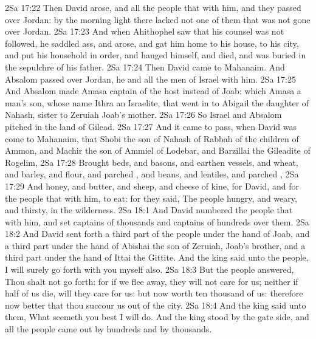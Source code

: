 \vs 2Sa 17:22 Then David arose, and all the people that  with him, and they passed over Jordan: by the morning light there lacked not one of them that was not gone over Jordan.
\vs 2Sa 17:23 And when Ahithophel saw that his counsel was not followed, he saddled  ass, and arose, and gat him home to his house, to his city, and put his household in order, and hanged himself, and died, and was buried in the sepulchre of his father.
\vs 2Sa 17:24 Then David came to Mahanaim. And Absalom passed over Jordan, he and all the men of Israel with him.
\vs 2Sa 17:25 And Absalom made Amasa captain of the host instead of Joab: which Amasa  a man's son, whose name  Ithra an Israelite, that went in to Abigail the daughter of Nahash, sister to Zeruiah Joab's mother.
\vs 2Sa 17:26 So Israel and Absalom pitched in the land of Gilead.
\vs 2Sa 17:27 And it came to pass, when David was come to Mahanaim, that Shobi the son of Nahash of Rabbah of the children of Ammon, and Machir the son of Ammiel of Lodebar, and Barzillai the Gileadite of Rogelim,
\vs 2Sa 17:28 Brought beds, and basons, and earthen vessels, and wheat, and barley, and flour, and parched , and beans, and lentiles, and parched ,
\vs 2Sa 17:29 And honey, and butter, and sheep, and cheese of kine, for David, and for the people that  with him, to eat: for they said, The people  hungry, and weary, and thirsty, in the wilderness.
\vs 2Sa 18:1 And David numbered the people that  with him, and set captains of thousands and captains of hundreds over them.
\vs 2Sa 18:2 And David sent forth a third part of the people under the hand of Joab, and a third part under the hand of Abishai the son of Zeruiah, Joab's brother, and a third part under the hand of Ittai the Gittite. And the king said unto the people, I will surely go forth with you myself also.
\vs 2Sa 18:3 But the people answered, Thou shalt not go forth: for if we flee away, they will not care for us; neither if half of us die, will they care for us: but now  worth ten thousand of us: therefore now  better that thou succour us out of the city.
\vs 2Sa 18:4 And the king said unto them, What seemeth you best I will do. And the king stood by the gate side, and all the people came out by hundreds and by thousands.
